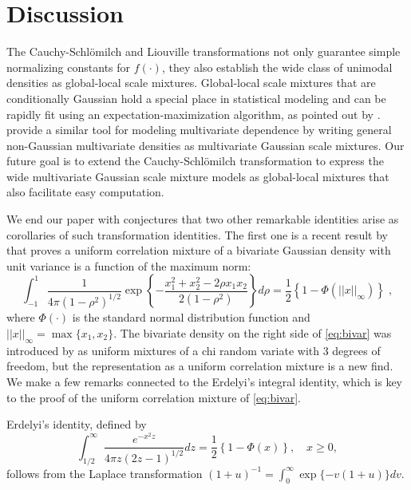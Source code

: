\documentclass[ECP]{ejpecp} %
\def\CS{Cauchy-Schl\"omilch}
\newcommand{\vectornorm}[1]{\left|\left|#1\right|\right|}
\newcommand{\half}{\frac{1}{2}}
\begin{document}
\section{Discussion}
\label{sec:discussion}

The \CS{} and Liouville transformations not only guarantee simple normalizing constants for $f(\cdot)$, they also establish the wide class of unimodal densities as global-local scale mixtures. Global-local scale mixtures that are conditionally Gaussian hold a special place in statistical modeling and can be rapidly fit using an expectation-maximization algorithm, as pointed out by \cite{polson_data_2013}. \cite{palmer_amica:_2011} provide a similar tool for modeling multivariate dependence by writing general non-Gaussian multivariate densities as multivariate Gaussian scale mixtures. Our future goal is to extend the \CS{} transformation to express the wide multivariate Gaussian scale mixture models as global-local mixtures that also facilitate easy computation.

We end our paper with conjectures that two other remarkable identities arise as corollaries of such transformation identities. The first one is a recent result by \cite{zhang2014uniform} that proves a uniform correlation mixture of a bivariate Gaussian density with unit variance is a function of the maximum norm: 
\begin{equation}
  \int_{-1}^{1} \frac{1}{4 \pi (1-\rho^2)^{1/2} } 
  \exp\left\{ - \frac{x_1^2 + x_2^2 - 2 \rho x_1 x_2}{2 (1-\rho^2)} \right\} d\rho = 
  \half \left\{1- \Phi(\vectornorm{x}_{\infty})\right\} 
  \;, 
  \label{eq:bivar}
\end{equation}
where $\Phi(\cdot)$ is the standard normal distribution function and $\vectornorm{x}_{\infty} = \max\{ x_1, x_2\}$. The bivariate density on the
right side of \eqref{eq:bivar} was introduced by \cite{bryson1982constructing} as uniform mixtures of a chi random variate with 3 degrees of freedom, but the representation as a uniform correlation mixture is a new find.  We make a few remarks connected to the Erdelyi's integral identity, which is key to the proof of the uniform correlation mixture of \eqref{eq:bivar}. 
\begin{lemma}
Erdelyi's identity, defined by
\begin{equation}
  \int_{1/2}^{\infty} \frac{e^{-x^2 z}}{4 \pi z 	(2z-1)^{1/2}} dz = \half \left\{1-\Phi(x)\right\}, \quad x \geq 0, \label{eq:erdelyi}
\end{equation}
follows from the Laplace transformation $(1+u)^{-1} = \int_0^{\infty} \exp\{-v(1+u)\} dv$. 
\end{lemma}
\end{document}
